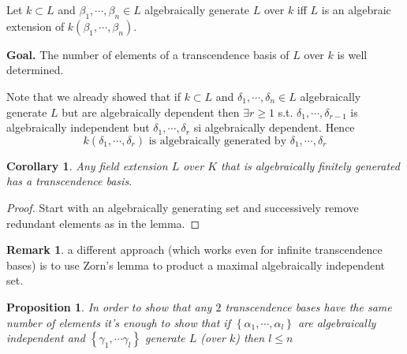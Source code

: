 \documentclass[11pt,a4paper]{article}
\theoremstyle{definition}
\newtheorem{remark}[definition]{Remark}
\theoremstyle{plain}
\newtheorem{proposition}[definition]{Proposition}
\newtheorem{corollary}[definition]{Corollary}
\theoremstyle{remark}
\renewcommand{\set}[1]{\left\{ #1 \right\}}
\begin{document}
Let $k \subset L$ and $\beta_1, \cdots, \beta_n \in L$ algebraically generate $L$ over $k$ iff $L$ is an algebraic 
extension of $k(\beta_1, \cdots,\beta_n)$. 

\textbf{Goal.} The number of elements of a transcendence basis of $L$ over $k$ is well determined.

Note that we already showed that if $k \subset L$ and $\delta_1, \cdots, \delta_n \in L$ algebraically generate $L$ 
but are algebraically dependent then $\exists r \ge 1$ s.t. $\delta_1, \cdots, \delta_{r-1}$ is algebraically independent but 
$\delta_1, \cdots, \delta_r$ si algebraically dependent. Hence 
$$k(\delta_1, \cdots, \delta_r) \text{ is algebraically generated by $\delta_1, \cdots, \delta_r$}$$

\begin{corollary}
    Any field extension $L$ over $K$ that is algebraically finitely generated has a transcendence basis. 
\end{corollary}

\begin{proof}
    Start with an algebraically generating set and successively remove redundant elements as in the lemma.
\end{proof}

\begin{remark}
    a different approach (which works even for infinite transcendence bases) is to use Zorn's lemma to product a 
    maximal algebraically independent set.
\end{remark}

\begin{proposition}
    In order to show that any $2$ transcendence bases have the same number of elements it's enough to show that 
    if $\set{\alpha_1, \cdots, \alpha_l}$ are algebraically independent and $\set{\gamma_1, \cdots \gamma_l}$ generate $L$ (over $k$) 
    then $l \le n$
\end{proposition}
\end{document}
